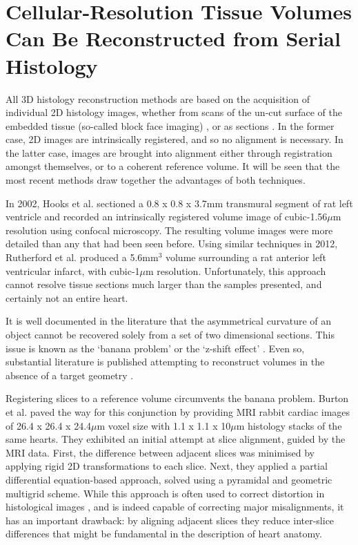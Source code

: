 \section{Cellular-Resolution Tissue Volumes Can Be Reconstructed from Serial Histology} %
\label{sec:cellular_resolution_tissue_volumes_can_be_reconstructed_from_serial_histology}
  All 3D histology reconstruction methods are based on the acquisition of individual 2D histology images, whether from scans of the un-cut surface of the embedded tissue (so-called block face imaging) \cite{Sands2005,Sands2006,Rutherford2012}, or as sections \cite{Burton2006,Plank2009}. In the former case, 2D images are intrinsically registered, and so no alignment is necessary. In the latter case, images are brought into alignment either through registration amongst themselves, or to a coherent reference volume. It will be seen that the most recent methods draw together the advantages of both techniques.
  
  In 2002, Hooks et al. \cite{Hooks2002} sectioned a 0.8 x 0.8 x 3.7mm transmural segment of rat left ventricle and recorded an intrinsically registered volume image of cubic-1.56$\mu$m resolution using confocal microscopy. The resulting volume images were more detailed than any that had been seen before. Using similar techniques in 2012, Rutherford et al. \cite{Rutherford2012} produced a 5.6mm$^3$ volume surrounding a rat anterior left ventricular infarct, with cubic-1$\mu$m resolution. Unfortunately, this approach cannot resolve tissue sections much larger than the samples presented, and certainly not an entire heart.
  
  It is well documented in the literature that the asymmetrical curvature of an object cannot be recovered solely from a set of two dimensional sections. This issue is known as the `banana problem' \cite{Malandain2004,Lyon2012} or the `z-shift effect' \cite{Yushkevich2006}. Even so, substantial literature is published attempting to reconstruct volumes in the absence of a target geometry \cite{Chakravarty2006,Schmitt2006,Cifor2009,Cifor2011}.
  
  Registering slices to a reference volume circumvents the banana problem. Burton et al. \cite{Burton2006} paved the way for this conjunction by providing MRI rabbit cardiac images of 26.4 x 26.4 x 24.4$\mu$m voxel size with 1.1 x 1.1 x 10$\mu$m histology stacks of the same hearts. They exhibited an initial attempt at slice alignment, guided by the MRI data. First, the difference between adjacent slices was minimised by applying rigid 2D transformations to each slice. Next, they applied a partial differential equation-based approach, solved using a pyramidal and geometric multigrid scheme. While this approach is often used to correct distortion in histological images \cite{Keeling2005}, and is indeed capable of correcting major misalignments, it has an important drawback: by aligning adjacent slices they reduce inter-slice differences that might be fundamental in the description of heart anatomy.
  
